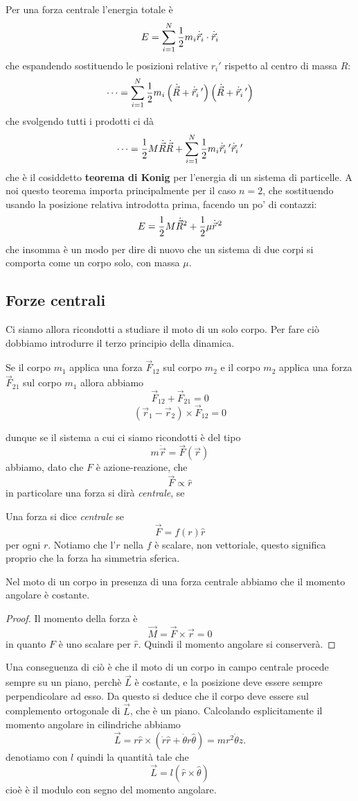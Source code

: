 \documentclass[11pt]{scrartcl}
\newcommand{\veloc}{\dot{\vec{r}}}
\newcommand{\accel}{\ddot{\vec{r}}}
\begin{document}
	Per una forza centrale l'energia totale è
	$$E=\sum_{i=1}^{N}\half m_i \veloc_i \cdot \veloc_i$$
	che espandendo sostituendo le posizioni relative $r_i'$ rispetto al centro di massa $R$:
	$$\dots=\sum_{i=1}^{N}\frac{1}{2} m_i \left(\dot{\vec{R}}+\dot{\vec{r}}_i\,'\right)\left(\dot{\vec{R}}+\dot{\vec{r}}_i\,'\right)$$
	che svolgendo tutti i prodotti ci dà
	$$\dots=\frac{1}{2} M \dot{\vec{R}}\dot{\vec{R}}+\sum_{i=1}^{N}\frac{1}{2} m_i \dot{\vec{r}}_i\,'\dot{\vec{r}}_i\,'$$
	che è il cosiddetto \textbf{teorema di Konig} per l'energia di un sistema di particelle. A noi questo teorema importa principalmente per il caso $n=2$, che sostituendo usando la posizione relativa introdotta prima, facendo un po' di contazzi:
	$$E=\half M \dot{\vec{R}}^2+\half \mu \veloc^{\,2}$$
	che insomma è un modo per dire di nuovo che un sistema di due corpi si comporta come un corpo solo, con massa $\mu$. 
	
	\subsection{Forze centrali}
	
	Ci siamo allora ricondotti a studiare il moto di un solo corpo. Per fare ciò dobbiamo introdurre il terzo principio della dinamica. 
	\begin{proposition}
		Se il corpo $m_1$ applica una forza $\vec{F}_{12}$ sul corpo $m_2$ e il corpo $m_2$ applica una forza $\vec{F}_{21}$ sul corpo $m_1$ allora abbiamo
		$$\vec{F}_{12}+\vec{F}_{21}=0$$
		$$\left(\vec{r}_1-\vec{r}_2\right)\times \vec{F}_{12}=0$$
	\end{proposition}
	dunque se il sistema a cui ci siamo ricondotti è del tipo
	$$m\accel = \vec{F}(\vec{r})$$
	abbiamo, dato che $F$ è azione-reazione, che 
	$$\vec{F}\propto \hat{r}$$
	in particolare una forza si dirà \textit{centrale}, se 
	\begin{definition}
		Una forza si dice \textit{centrale} se 
		$$\vec{F}=f(r)\hat{r}$$
		per ogni $r$. Notiamo che l'$r$ nella $f$ è scalare, non vettoriale, questo significa proprio che la forza ha simmetria sferica.
	\end{definition}
	\begin{lemma}
		Nel moto di un corpo in presenza di una forza centrale abbiamo che il momento angolare è costante.
	\end{lemma}
	\begin{proof}
		Il momento della forza è
		$$\vec{M}=\vec{F}\times \vec{r}=0$$
		in quanto $F$ è uno scalare per $\hat{r}$. Quindi il momento angolare si conserverà.
	\end{proof}
	Una conseguenza di ciò è che il moto di un corpo in campo centrale procede sempre su un piano, perchè $\vec{L}$ è costante, e la posizione deve essere sempre perpendicolare ad esso. Da questo si deduce che il corpo deve essere sul complemento ortogonale di $\vec{L}$, che è un piano. Calcolando esplicitamente il momento angolare in cilindriche abbiamo
	$$\vec{L}=r\hat{r}\times\left(\dot{r}\hat{r}+\dot{\theta}r\hat{\theta}\right)=mr^2\dot{\theta}\hat{z}.$$
	denotiamo con $l$ quindi la quantità tale che
	$$\vec{L}=l\left(\hat{r}\times \hat{\theta}\right)$$
	cioè è il modulo con segno del momento angolare.
\end{document}

